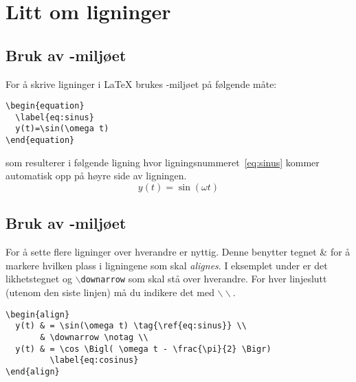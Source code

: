 

\chapter{Litt om ligninger}\label{kap:ligninger}

\section{Bruk av -miljøet}\label{delkap:equation}
For å skrive ligninger i {\LaTeX} brukes -miljøet
på følgende måte: 

\begin{boxedminipage}{\textwidth}
\begin{verbatim}
\begin{equation}
  \label{eq:sinus}
  y(t)=\sin(\omega t)
\end{equation}
\end{verbatim}
\end{boxedminipage}

som resulterer i følgende ligning hvor ligningsnummeret~\eqref{eq:sinus}
kommer automatisk opp på høyre side av ligningen.
\begin{equation}
  \label{eq:sinus}
  y(t)=\sin(\omega t)
\end{equation}


\section{Bruk av -miljøet}\label{delkap:align}
For å sette flere ligninger over hverandre er 
 nyttig. Denne benytter tegnet {\&} for å markere
hvilken plass i ligningene som skal {\em alignes}.
I  eksemplet under er det likhetstegnet og 
{\tt $\backslash$downarrow}  som skal stå
over hverandre. For hver linjeslutt {\color{red}(utenom den siste
  linjen)} må du indikere det med
$\backslash\backslash$.

\begin{boxedminipage}{\textwidth}
\begin{verbatim}
\begin{align}
  y(t) & = \sin(\omega t) \tag{\ref{eq:sinus}} \\
       & \downarrow \notag \\
  y(t) & = \cos \Bigl( \omega t - \frac{\pi}{2} \Bigr) 
         \label{eq:cosinus}
\end{align}
\end{verbatim}
\end{boxedminipage}
 
